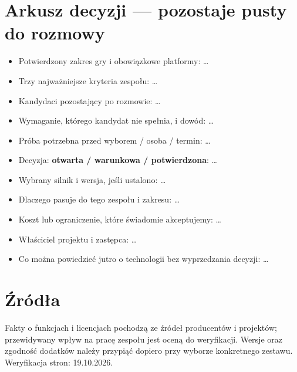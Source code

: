 \documentclass[10pt,a4paper]{article}
\begin{document}
\section*{Arkusz decyzji — pozostaje pusty do rozmowy}


\begin{itemize}
\item Potwierdzony zakres gry i obowiązkowe platformy: …
\item Trzy najważniejsze kryteria zespołu: …
\item Kandydaci pozostający po rozmowie: …
\item Wymaganie, którego kandydat nie spełnia, i dowód: …
\item Próba potrzebna przed wyborem / osoba / termin: …
\item Decyzja: \textbf{otwarta / warunkowa / potwierdzona}: …
\item Wybrany silnik i wersja, jeśli ustalono: …
\item Dlaczego pasuje do tego zespołu i zakresu: …
\item Koszt lub ograniczenie, które świadomie akceptujemy: …
\item Właściciel projektu i zastępca: …
\item Co można powiedzieć jutro o technologii bez wyprzedzania decyzji: …
\end{itemize}


\clearpage
\section*{Źródła}


Fakty o funkcjach i licencjach pochodzą ze źródeł producentów i projektów; przewidywany wpływ na pracę zespołu jest oceną do weryfikacji. Wersje oraz zgodność dodatków należy przypiąć dopiero przy wyborze konkretnego zestawu. Weryfikacja stron: 19.10.2026.
\end{document}
